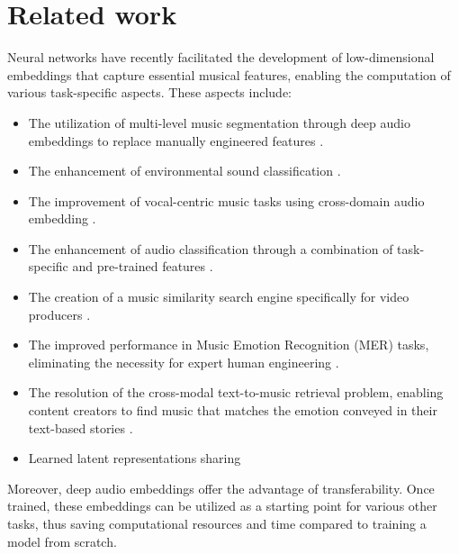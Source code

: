 \section{Related work}

Neural networks have recently facilitated the development of low-dimensional embeddings that capture essential musical features, enabling the computation of various task-specific aspects. These aspects include:

\begin{itemize}

\item The utilization of multi-level music segmentation through deep audio embeddings to replace manually engineered features \cite{SalamonDeepSegmentation}.

\item The enhancement of environmental sound classification \cite{Kim2020OneStrategies}.

\item The improvement of vocal-centric music tasks using cross-domain audio embedding \cite{Kim2021LearningLoss}.

\item The enhancement of audio classification through a combination of task-specific and pre-trained features \cite{Hung2022Feature-informedClassification}.

\item The creation of a music similarity search engine specifically for video producers \cite{epidemic}.

\item The improved performance in Music Emotion Recognition (MER) tasks, eliminating the necessity for expert human engineering \cite{KohComparisonRecognition}.

\item The resolution of the cross-modal text-to-music retrieval problem, enabling content creators to find music that matches the emotion conveyed in their text-based stories \cite{WonEmotionStories}.

\item  Learned latent representations sharing \cite{HamelTransferSimilarity}

\end{itemize}

Moreover, deep audio embeddings offer the advantage of transferability. Once trained, these embeddings can be utilized as a starting point for various other tasks, thus saving computational resources and time compared to training a model from scratch.

